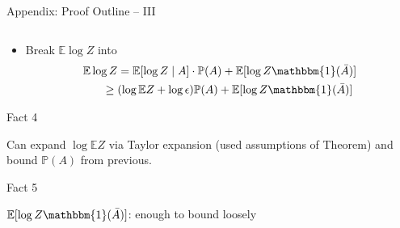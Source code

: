 \documentclass[presentation,12pt]{beamer}
\newcommand{\Expct}{\mathbb{E}}
\newcommand{\Ind}{\mathbbm{1}}
\newcommand{\Prob}{\mathbb{P}}
\begin{document}
\begin{frame}{Appendix: Proof Outline -- III}
  \begin{columns}
  \begin{column}{0.8\textwidth}
    \begin{itemize}
      \item Break $\Expct \log Z$ into 
      \begin{align*}
          \Expct \log Z &= \Expct [\log Z \mid A] \cdot \Prob(A) 
            + \Expct[\log Z \Ind(\bar A)] \notag \\
          &\!\!\!\!\!\!\!\!\ge (\log \Expct Z + \log \epsilon) \Prob(A) 
            + \Expct[\log Z \Ind(\bar A)]
      \end{align*}
    \end{itemize}

  \vspace{-1em}

  \begin{block}{\rule[-0.6ex]{0pt}{2.5ex}Fact 4}
  Can expand $\log \Expct Z$ via Taylor expansion (used assumptions of
  Theorem) and bound $\Prob(A)$ from previous.
  \end{block}

  \begin{block}{\rule[-0.6ex]{0pt}{2.5ex}Fact 5}
    $\Expct[\log Z \Ind(\bar A)]$: enough to bound loosely
  \end{block}


\end{column}
\end{columns}
\end{frame}
\end{document}
